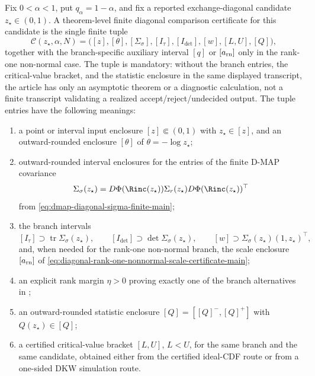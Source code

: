 \ifdefined\SUPPLEMENTARYFULLPROTOCOLS
\begin{algorithmiclemma}\label{thm:certified-diagonal-inference-main}\label{prop:projected-gaussian-certificate-interface-main}
Fix \(0<\alpha<1\), put \(q_\alpha=1-\alpha\), and fix a reported exchange-diagonal
candidate \(z_\star\in(0,1)\).  A theorem-level finite diagonal comparison
certificate for this candidate is the single finite tuple
\[
\mathcal C(z_\star,\alpha,N)
=\bigl([z],[\theta],[\Sigma_\sigma],[I_\tau],
[I_{\det}],[w],[L,U],[Q]\bigr),
\]
together with the branch-specific auxiliary interval \([q]\) or
\([a_{\rm rn}]\) only in the rank-one non-normal case.  The tuple is mandatory:
without the branch entries, the critical-value bracket, and the statistic
enclosure in the same displayed transcript, the article has only an
asymptotic theorem or a diagnostic calculation, not a finite transcript
validating a realized accept/reject/undecided output.  The tuple entries have
the following meanings:
\begin{enumerate}[label=\textup{(\roman*)},leftmargin=2.4em,itemsep=0.25em]
\item a point or interval input enclosure \([z]\Subset(0,1)\) with
\(z_\star\in[z]\), and an outward-rounded enclosure \([\theta]\) of
\(\theta=-\log z_\star\);
\item outward-rounded interval enclosures for the entries of the finite
D-MAP covariance
\[
\Sigma_\sigma(z_\star)
=D\Phi(\Rinc(z_\star))\Sigma_r(z_\star)D\Phi(\Rinc(z_\star))^\top
\]
from \eqref{eq:dmap-diagonal-sigma-finite-main};
\item the branch intervals
\[
[I_\tau]\supset\operatorname{tr}\Sigma_\sigma(z_\star),\qquad
[I_{\det}]\supset\det\Sigma_\sigma(z_\star),\qquad
[w]\supset\Sigma_\sigma(z_\star)(1,z_\star)^\top,
\]
and, when needed for the rank-one non-normal branch, the scale enclosure
\([a_{\rm rn}]\) of
\eqref{eq:diagonal-rank-one-nonnormal-scale-certificate-main};
\item an explicit rank margin \(\eta>0\) proving exactly one of the branch
alternatives in ;
\item an outward-rounded statistic enclosure \([Q]=[[Q]^-,[Q]^+]\) with
\(Q(z_\star)\in[Q]\);
\item a certified critical-value bracket \([L,U]\), \(L<U\), for the same
branch and the same candidate, obtained either from the certified ideal-CDF
route or from a one-sided DKW simulation route.
\end{enumerate}

\end{algorithmiclemma}
